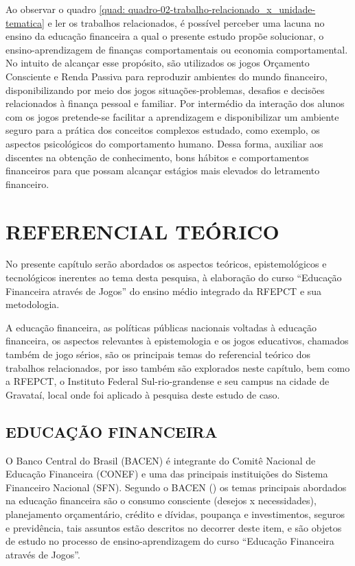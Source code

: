 Ao observar o quadro \ref{quad: quadro-02-trabalho-relacionado_x_unidade-tematica} e ler os trabalhos relacionados, é possível perceber uma lacuna no ensino da educação financeira a qual o presente estudo propõe solucionar, o ensino-aprendizagem de finanças comportamentais ou economia comportamental. No intuito de alcançar esse propósito, são utilizados os jogos Orçamento Consciente e Renda Passiva para reproduzir ambientes do mundo financeiro, disponibilizando por meio dos jogos situações-problemas, desafios e decisões relacionados à finança pessoal e familiar. Por intermédio da interação dos alunos com os jogos pretende-se facilitar a aprendizagem e disponibilizar um ambiente seguro para a prática dos conceitos complexos estudado, como exemplo, os aspectos psicológicos do comportamento humano. Dessa forma, auxiliar aos discentes na obtenção de conhecimento, bons hábitos e comportamentos financeiros para que possam alcançar estágios mais elevados do letramento financeiro.

\chapter{REFERENCIAL TEÓRICO}
No presente capítulo serão abordados os aspectos teóricos, epistemológicos e tecnológicos inerentes ao tema desta pesquisa, à elaboração do curso “Educação Financeira através de Jogos” do ensino médio integrado da RFEPCT e sua metodologia.

A educação financeira, as políticas públicas nacionais voltadas à educação financeira, os aspectos relevantes à epistemologia e os jogos educativos, chamados também de jogo sérios, são os principais temas do referencial teórico dos trabalhos relacionados, por isso também são explorados neste capítulo, bem como a RFEPCT, o Instituto Federal Sul-rio-grandense e seu campus na cidade de Gravataí, local onde foi aplicado à pesquisa deste estudo de caso.

\section{EDUCAÇÃO FINANCEIRA}
O Banco Central do Brasil (BACEN) é integrante do Comitê Nacional de Educação Financeira (CONEF) e uma das principais instituições do Sistema Financeiro Nacional (SFN). Segundo o BACEN (\citeyear{bacen2013}) os temas principais abordados na educação financeira são o consumo consciente (desejos x necessidades), planejamento orçamentário, crédito e dívidas, poupança e investimentos, seguros e previdência, tais assuntos estão descritos no decorrer deste item, e são objetos de estudo no processo de ensino-aprendizagem do curso “Educação Financeira através de Jogos”.

